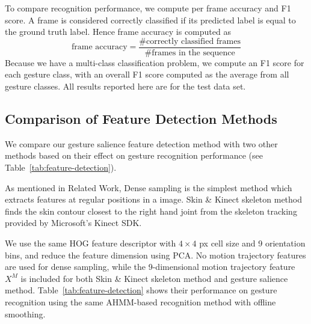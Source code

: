 \documentclass{sigchi}
\newcommand\tabhead[1]{\small\textbf{#1}}
\begin{document}
To compare recognition performance, we compute per frame accuracy and F1 score. 
A frame is considered correctly classified if its predicted label is equal to the ground truth label.
Hence frame accuracy is computed as
\begin{displaymath}
\text{frame accuracy} = \frac{\text{\# correctly classified frames}}{\text{\# frames in the sequence}}
\end{displaymath}
Because we have a multi-class classification problem, we compute an F1 score for each gesture class, with an 
 overall F1 score computed as the average from all gesture classes. All results
reported here are for the test data set.

\subsection{Comparison of Feature Detection Methods}
We compare our gesture salience feature detection method with two other
methods based on their effect on gesture recognition performance (see Table~\ref{tab:feature-detection}). 

As mentioned in Related Work, Dense sampling is the simplest method which extracts features at
regular positions in a image. Skin \& Kinect skeleton method finds the skin contour closest to the right hand
joint from the skeleton tracking provided by Microsoft's Kinect SDK.

We use the same HOG feature descriptor with $4\times 4$ px cell size and 9
orientation bins, and reduce the feature dimension using PCA.
No motion trajectory features are used for dense sampling, while the
9-dimensional motion trajectory feature $X^M$ is included for both Skin \&
Kinect skeleton method and gesture salience method.
Table~\ref{tab:feature-detection} shows their performance on gesture recognition using the same AHMM-based recognition method with offline smoothing.
\end{document}
